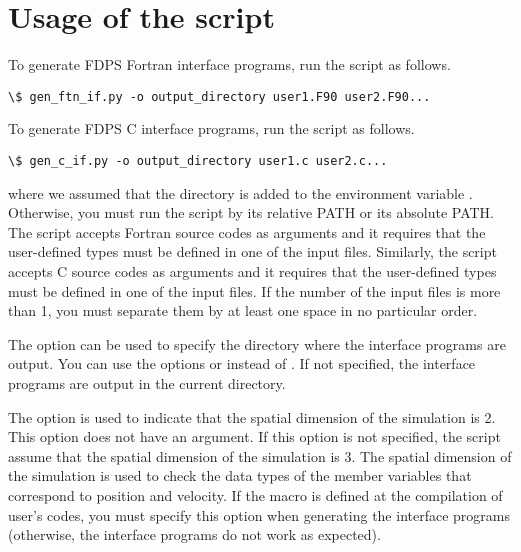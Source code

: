 \section{Usage of the script}
To generate FDPS Fortran interface programs, run the script  as follows.
\begin{screen}
\begin{Verbatim}[commandchars=\\\{\}]
\$ gen_ftn_if.py -o output_directory user1.F90 user2.F90... 
\end{Verbatim}
\end{screen}
To generate FDPS C interface programs, run the script  as follows.
\begin{screen}
\begin{Verbatim}[commandchars=\\\{\}]
\$ gen_c_if.py -o output_directory user1.c user2.c... 
\end{Verbatim}
\end{screen}
where we assumed that the directory  is added to the environment variable . Otherwise, you must run the script by its relative PATH or its absolute PATH. The script  accepts Fortran source codes as arguments and it requires that the user-defined types must be defined in one of the input files. Similarly, the script  accepts C source codes as arguments and it requires that the user-defined types must be defined in one of the input files. If the number of the input files is more than 1, you must separate them by at least one space in no particular order.

The option  can be used to specify the directory where the interface programs are output. You can use the options  or  instead of . If not specified, the interface programs are output in the current directory.

The option  is used to indicate that the spatial dimension of the simulation is 2. This option does not have an argument. If this option is not specified, the script assume that the spatial dimension of the simulation is 3. The spatial dimension of the simulation is used to check the data types of the member variables that correspond to position and velocity. If the macro  is defined at the compilation of user's codes, you must specify this option when generating the interface programs (otherwise, the interface programs do not work as expected).

